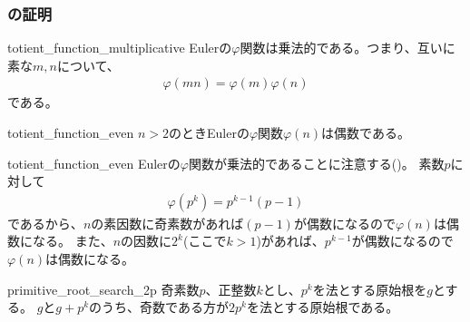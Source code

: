 \subsubsection{の証明}

\begin{Lemm}{}{totient_function_multiplicative}
Eulerの$\varphi$関数は乗法的である。つまり、互いに素な$m,n$について、
\begin{align*}
\varphi(mn) = \varphi(m)\varphi(n)
\end{align*}
である。
\end{Lemm}

\begin{Lemm}{}{totient_function_even}
$n>2$のときEulerの$\varphi$関数$\varphi(n)$は偶数である。
\end{Lemm}

\begin{lmProof}{totient_function_even}
Eulerの$\varphi$関数が乗法的であることに注意する()。
素数$p$に対して
\begin{align*}
\varphi(p^k) = p^{k-1}(p-1)
\end{align*}
であるから、$n$の素因数に奇素数があれば$(p-1)$が偶数になるので$\varphi(n)$は偶数になる。
また、$n$の因数に$2^k$(ここで$k>1$)があれば、$p^{k-1}$が偶数になるので$\varphi(n)$は偶数になる。
\end{lmProof}

\begin{Prop}{}{primitive_root_search_2p}
奇素数$p$、正整数$k$とし、$p^k$を法とする原始根を$g$とする。
$g$と$g+p^k$のうち、奇数である方が$2p^k$を法とする原始根である。
\end{Prop}

